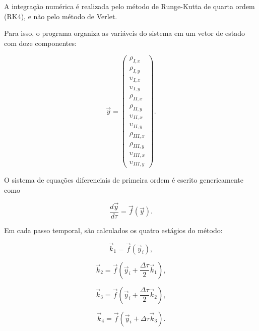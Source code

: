 \documentclass[12pt,a4paper]{article}
\begin{document}
A integração numérica é realizada pelo método de Runge-Kutta de quarta ordem (RK4), e não pelo método de Verlet.

Para isso, o programa organiza as variáveis do sistema em um vetor de estado com doze componentes:

\begin{equation}
    \vec{y}=
    \begin{pmatrix}
    \rho_{I,x}\\
    \rho_{I,y}\\
    \upsilon_{I,x}\\
    \upsilon_{I,y}\\
    \rho_{II,x}\\
    \rho_{II,y}\\
    \upsilon_{II,x}\\
    \upsilon_{II,y}\\
    \rho_{III,x}\\
    \rho_{III,y}\\
    \upsilon_{III,x}\\
    \upsilon_{III,y}
    \end{pmatrix}.
\end{equation}

O sistema de equações diferenciais de primeira ordem é escrito genericamente como

\begin{equation}
    \frac{d\vec{y}}{d\tau}
    =\vec{f}(\vec{y}).
\end{equation}

Em cada passo temporal, são calculados os quatro estágios do método:

\begin{equation}
    \vec{k}_1=
    \vec{f}(\vec{y}_i),
\end{equation}

\begin{equation}
    \vec{k}_2=
    \vec{f}\left(
    \vec{y}_i+\frac{\Delta\tau}{2}\vec{k}_1
    \right),
\end{equation}

\begin{equation}
    \vec{k}_3=
    \vec{f}\left(
    \vec{y}_i+\frac{\Delta\tau}{2}\vec{k}_2
    \right),
\end{equation}

\begin{equation}
    \vec{k}_4=
    \vec{f}\left(
    \vec{y}_i+\Delta\tau\vec{k}_3
    \right).
\end{equation}
\end{document}
